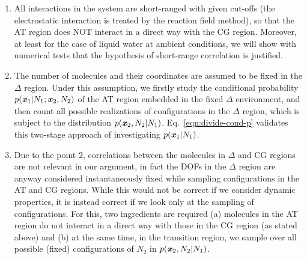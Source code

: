 \documentclass[aip,jcp,a4paper,reprint,onecolumn]{revtex4-1}
\newcommand{\vect}[1]{\textbf{\textit{#1}}}
\newcommand{\HY}{{\Delta}}
\begin{document}
\begin{enumerate}\itemsep -1pt
\item All interactions in the system are short-ranged with given cut-offs (the
  electrostatic interaction is treated by the reaction field method),
  so that the AT region does NOT interact in a direct way with the CG region.
    Moreover, at least for the case of liquid water at ambient conditions, we will show with numerical tests that the hypothesis of short-range correlation is justified.
\item The number of molecules and their coordinates are assumed to be
  fixed in the $\HY$ region.  Under this assumption, we firstly study
  the conditional probability $p(\vect x_1 | N_1; \vect x_2, N_2)$ of
  the AT region embedded in the fixed $\HY$ environment, and then count
  all possible realizations of configurations in the $\HY$ region, which is subject to
  the distribution $p(\vect x_2, N_2 | N_1)$.
  Eq.~\eqref{eqn:divide-cond-p} validates this two-stage approach of
  investigating $p(\vect x_1 | N_1)$.
\item Due to the point 2, correlations between the molecules
  in $\HY$ and CG regions are not relevant in our argument, in fact
  the DOFs in the $\HY$ region are anyway considered instantaneously fixed while sampling configurations in the AT and CG regions.
While this would not be correct if we consider dynamic properties, it is instead correct if we look only at the sampling of configurations. For this, two ingredients are required (a) molecules in the AT region do not interact in a direct way with those in the CG region (as stated above) and (b) at the same time, in the transition region, we sample over all possible (fixed) configurations of $N_{2}$ in $p(\vect x_2, N_2 | N_1)$. 
\end{enumerate}
\end{document}

